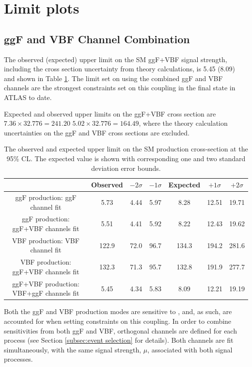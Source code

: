 \section{Limit plots}

\subsection{ggF and VBF Channel Combination}

The observed (expected) upper limit on the SM ggF+VBF signal strength, including the cross section uncertainty from theory calculations, is 5.45 (8.09) and shown in Table \ref{table:ggfvbf-sm-xs-tab}. The limit set on \kl using the combined ggF and VBF channels are the strongest constraints set on this coupling in the \bbbb final state in ATLAS to date. 

Expected and observed upper limits on the ggF+VBF cross section are $7.36 \times 32.776 = 241.20$ $5.02 \times 32.776 = 164.49$, where the theory calculation uncertainties on the ggF and VBF cross sections are excluded.

\begin{table}[h]
	\centering
	\caption{The observed and expected upper limit on the SM \HH production cross-section at the 95\% CL. The expected value is shown with corresponding one and two standard deviation error bounds.}
	\begin{tabular}{c c c c c c c}
		\toprule
		{} & {Observed} & {$-2\sigma$} & {$-1\sigma$} & {Expected} & {$+1\sigma$} & {$+2\sigma$}\\
		\midrule
		{ggF production: ggF channel fit} & {5.73}  & {4.44} & {5.97} & {8.28} & {12.51} & {19.71}  \\
		{ggF production: ggF+VBF channels fit} & {5.51}  & {4.41} & {5.92} & {8.22} & {12.43} & {19.62}  \\
		{VBF production: VBF channel fit} & {122.9}  & {72.0} & {96.7} & {134.3} & {194.2} & {281.6}  \\
		{VBF production: ggF+VBF channels fit} & {132.3}  & {71.3} & {95.7} & {132.8} & {191.9} & {277.7}  \\
		{ggF+VBF production: VBF+ggF channels fit} & {5.45} & {4.34} & {5.83} & {8.09} & {12.21} & {19.19} \\
		\bottomrule
	\end{tabular}
\label{table:ggfvbf-sm-xs-tab}
\end{table}

Both the ggF and VBF \HH production modes are sensitive to \kl, and, as such, are accounted for when setting constraints on this coupling. In order to combine sensitivities from both ggF and VBF, orthogonal channels are defined for each process (see Section \ref{subsec:event selection} for details). Both channels are fit simultaneously, with the same signal strength, \(\mu\), associated with both signal processes.

